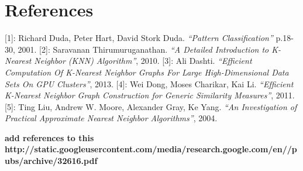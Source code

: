 \section{References}

[1]: Richard Duda, Peter Hart, David Stork Duda. 
\textit{``Pattern Classification''} p.18-30, 2001.
[2]: Saravanan Thirumuruganathan. 
\textit{``A Detailed Introduction to K-Nearest Neighbor (KNN) Algorithm''}, 2010. 
[3]: Ali Dashti. 
\textit{``Efficient Computation Of K-Nearest Neighbor Graphs For Large High-Dimensional Data Sets On GPU Clusters''}, 2013.
[4]: Wei Dong, Moses Charikar, Kai Li. 
\textit{``Efﬁcient K-Nearest Neighbor Graph Construction for Generic Similarity Measures''}, 2011.
[5]: Ting Liu, Andrew W. Moore, Alexander Gray, Ke Yang. 
\textit{``An Investigation of Practical Approximate Nearest Neighbor Algorithms''}, 2004.

\textbf{add references to this http://static.googleusercontent.com/media/research.google.com/en//pubs/archive/32616.pdf}
